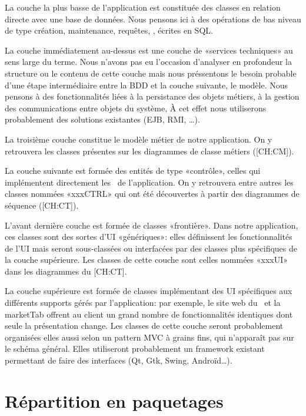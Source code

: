 \startitemize
\item La couche la plus basse de l'application est constituée des classes en relation directe avec une base de données. 
Nous pensons ici à des opérations de bas niveau de type création, maintenance, requêtes, \etc, écrites en SQL.
\item La couche immédiatement au-dessus est une couche de «services techniques» au sens large du terme.
Nous n'avons pas eu l'occasion d'analyser en profondeur la structure ou le contenu de cette couche mais nous préssentons le besoin probable d'une étape intermédiaire entre la BDD et la couche suivante, le modèle.
Nous pensons à des fonctionnalités liées à la persistance des objets métiers, à la gestion des communications entre objets du système, \etc 
À cet effet nous utiliserons probablement des solutions existantes (EJB, RMI, \dots).\par
\item La troisième couche constitue le modèle métier de notre application.
On y retrouvera les classes présentes sur les diagrammes de classe métiers ([CH:CM]).
\item La couche suivante est formée des entités de type «contrôle», \cad celles qui implémentent directement les \cu\ de l'application.
On y retrouvera entre autres les classes nommées «xxxCTRL» qui ont été découvertes à partir des diagrammes de séquence ([CH:CT]).
\item L'avant dernière couche est formée de classes «frontière». 
Dans notre application, ces classes sont des sortes d'UI «génériques»: elles définissent les fonctionnalités de l'UI mais seront sous-classées ou interfacées par des classes plus spécifiques de la couche supérieure.
Les classes de cette couche sont celles nommées «xxxUI» dans les diagrammes du [CH:CT].
\item La couche supérieure est formée de classes implémentant des UI spécifiques aux différents supports gérés par l'application: par exemple, le site web du \fm\ et la marketTab offrent au client un grand nombre de fonctionnalités identiques dont seule la présentation change.
Les classes de cette couche seront probablement organisées elles aussi selon un pattern MVC à grains fins, qui n'apparaît pas sur le schéma général.
Elles utiliseront probablement un framework existant permettant de faire des interfaces (Qt, Gtk, Swing, Androïd\dots).
\stopitemize


\section{Répartition en paquetages}

